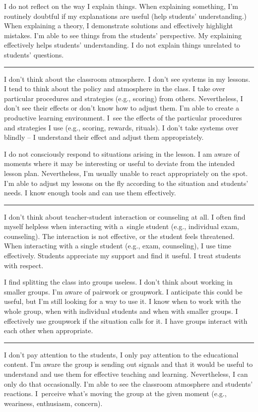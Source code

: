 \newpage
{}
{I do not reflect on the way I explain things.}
{When explaining something, I'm routinely doubtful if my explanations are useful (help students' understanding.)}
{When explaining a theory, I demonstrate solutions and effectively highlight mistakes. I'm able to see things from the students' perspective. My explaining effectively helps students' understanding. I do not explain things unrelated to students' questions.}

\rule{\textwidth}{0.4pt}
{I don't think about the classroom atmosphere. I don't see systems in my lessons.}
{I tend to think about the policy and atmosphere in the class. I take over particular procedures and strategies (e.g., scoring) from others. Nevertheless, I don't see their effects or don't know how to adjust them.}
{I'm able to create a productive learning environment. I~see the effects of the particular procedures and strategies I use (e.g., scoring, rewards, rituals). I don't take systems over blindly -- I understand their effect and adjust them appropriately.}

\newpage
{}
{I do not consciously respond to situations arising in the lesson.}
{I am aware of moments where it may be interesting or useful to deviate from the intended lesson plan. Nevertheless, I'm usually unable to react appropriately on the spot.}
{I'm able to adjust my lessons on the fly according to the situation and students' needs. I know enough tools and can use them effectively.}

\rule{\textwidth}{0.4pt}
{I don't think about teacher-student interaction or counseling at all.}
{I often find myself helpless when interacting with a~single student (e.g., individual exam, counseling). The interaction is not effective, or the student feels threatened.}
{When interacting with a single student (e.g., exam, counseling), I use time effectively. Students appreciate my support and find it useful. I treat students with respect. }

\newpage
{}
{I find splitting the class into groups useless. I don't think about working in smaller groups.}
{I'm aware of pairwork or groupwork. I anticipate this could be useful, but I'm still looking for a way to use it.}
{I know when to work with the whole group, when with individual students and when with smaller groups. I effectively use groupwork if the situation calls for it. I have groups interact with each other when appropriate.}

\rule{\textwidth}{0.4pt}
{I don't pay attention to the students, I only pay attention to the educational content.}
{I'm aware the group is sending out signals and that it would be useful to understand and use them for effective teaching and learning. Nevertheless, I can only do that occasionally.}
{I'm able to see the classroom atmosphere and students' reactions. I~perceive what's moving the group at the given moment (e.g., weariness, enthusiasm, concern).}
